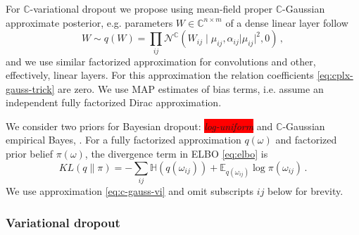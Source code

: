 \documentclass[a4paper,10pt]{article}
\newcommand{\cplx}{\mathbb{C}}
\newcommand{\verify}[1]{\textit{\!\colorbox{red}{#1}\!}}
\begin{document}
For $\cplx$-variational dropout we propose using mean-field proper $\cplx$-Gaussian approximate
posterior, e.g. parameters $W \in \cplx^{n\times m}$ of a dense linear layer follow
\begin{equation}  \label{eq:c-gauss-vi}
  W \sim q(W)
    = \prod_{ij} \mathcal{N}^{\cplx}(
      W_{ij} \mid
        \mu_{ij},
        \alpha_{ij} \lvert \mu_{ij} \rvert^2,
        0
    )
  \,,
\end{equation}
and we use similar factorized approximation for convolutions and other, effectively, linear
layers. For this approximation the relation coefficients \eqref{eq:cplx-gauss-trick} are
zero. We use MAP estimates of bias terms, i.e. assume an independent fully factorized Dirac
approximation.

We consider two priors for Bayesian dropout: \verify{log-uniform} and $\cplx$-Gaussian empirical
Bayes, \citep{kingma_variational_2015,molchanov_variational_2017,kharitonov_variational_2018}.
For a fully factorized approximation $q(\omega)$ and factorized prior belief $\pi(\omega)$,
the divergence term in ELBO \eqref{eq:elbo} is
\begin{equation}  \label{eq:elbo-general-kl-div}
  KL(q \| \pi)
    = - \sum_{ij}
        \mathbb{H}(q(\omega_{ij}))
        + \mathbb{E}_{q(\omega_{ij})} \log{\pi(\omega_{ij})}
    \,.
\end{equation}
We use approximation \eqref{eq:c-gauss-vi} and omit subscripts ${ij}$ below for brevity.

\subsubsection{Variational dropout} %
\label{ssub:variational_dropout}
\end{document}
